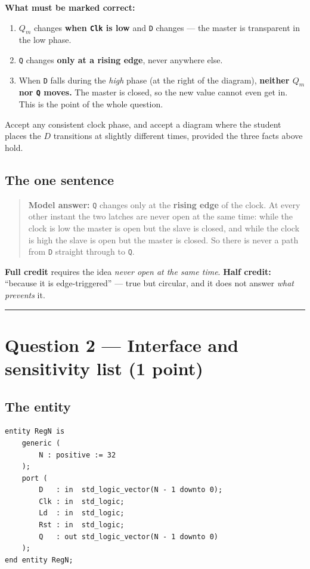 \documentclass[11pt]{article}
\newcommand{\code}[1]{\texttt{#1}}
\newcommand{\hr}{\vspace{2pt}\hrule\vspace{6pt}}
\begin{document}
\textbf{What must be marked correct:}

\begin{enumerate}[leftmargin=2em,itemsep=2pt]
\item $Q_m$ changes \textbf{when \code{Clk} is low} and \code{D} changes --- the
master is transparent in the low phase.
\item \code{Q} changes \textbf{only at a rising edge}, never anywhere else.
\item When \code{D} falls during the \emph{high} phase (at the right of the
diagram), \textbf{neither $Q_m$ nor \code{Q} moves.} The master is closed, so the
new value cannot even get in. This is the point of the whole question.
\end{enumerate}

Accept any consistent clock phase, and accept a diagram where the student places
the $D$ transitions at slightly different times, provided the three facts above
hold.

\subsection*{The one sentence}

\begin{quote}
\textbf{Model answer:} \code{Q} changes only at the \textbf{rising edge} of the
clock. At every other instant the two latches are never open at the same time:
while the clock is low the master is open but the slave is closed, and while the
clock is high the slave is open but the master is closed. So there is never a path
from \code{D} straight through to \code{Q}.
\end{quote}

\textbf{Full credit} requires the idea \emph{never open at the same time}.
\textbf{Half credit:} ``because it is edge-triggered'' --- true but circular, and
it does not answer \emph{what prevents} it.

\vspace{4pt}\hr

\section*{Question 2 --- Interface and sensitivity list (1 point)}

\subsection*{The entity}

\begin{lstlisting}
entity RegN is
    generic (
        N : positive := 32
    );
    port (
        D   : in  std_logic_vector(N - 1 downto 0);
        Clk : in  std_logic;
        Ld  : in  std_logic;
        Rst : in  std_logic;
        Q   : out std_logic_vector(N - 1 downto 0)
    );
end entity RegN;
\end{lstlisting}
\end{document}
